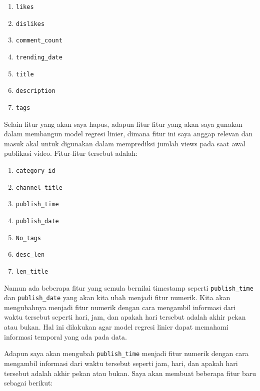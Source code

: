 \begin{enumerate}
    \item \texttt{likes}
    \item \texttt{dislikes}
    \item \texttt{comment\_count}
    \item \texttt{trending\_date}
    \item \texttt{title}
    \item \texttt{description}
    \item \texttt{tags}
\end{enumerate}





Selain fitur yang akan saya hapus, adapun fitur fitur yang akan saya gunakan dalam membangun model regresi linier, dimana fitur ini saya anggap relevan dan masuk akal untuk digunakan dalam memprediksi jumlah views pada saat awal publikasi video. Fitur-fitur tersebut adalah:

\begin{enumerate}
    \item \texttt{category\_id}
    \item \texttt{channel\_title}
    \item \texttt{publish\_time}
    \item \texttt{publish\_date}
    \item \texttt{No\_tags}
    \item \texttt{desc\_len}
    \item \texttt{len\_title}
\end{enumerate}

Namun ada beberapa fitur yang semula bernilai timestamp seperti \texttt{publish\_time} dan \texttt{publish\_date} yang akan kita ubah menjadi fitur numerik. Kita akan mengubahnya menjadi fitur numerik dengan cara mengambil informasi dari waktu tersebut seperti hari, jam, dan apakah hari tersebut adalah akhir pekan atau bukan. Hal ini dilakukan agar model regresi linier dapat memahami informasi temporal yang ada pada data.

Adapun saya akan mengubah \texttt{publish\_time} menjadi fitur numerik dengan cara mengambil informasi dari waktu tersebut seperti jam, hari, dan apakah hari tersebut adalah akhir pekan atau bukan. Saya akan membuat beberapa fitur baru sebagai berikut:

